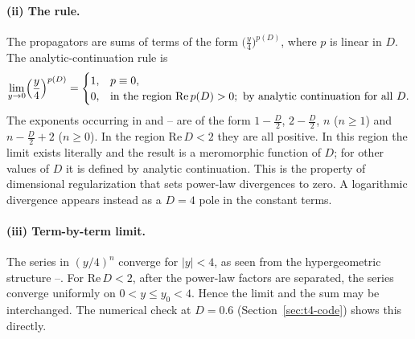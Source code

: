 \paragraph{(ii) The rule.} The propagators are sums of terms of the form
\(\bigl(\tfrac y4\bigr)^{p(D)}\), where \(p\) is linear in \(D\). The analytic-continuation
rule is
\begin{equation}\label{eq:t4-rule}
\lim_{y\to0}\Bigl(\frac y4\Bigr)^{p(D)}=\begin{cases}1,& p\equiv0,\\
0,& \text{in the region }\mathrm{Re}\,p(D)>0;\ \text{by analytic continuation for all }D.\end{cases}
\end{equation}
The exponents occurring in  and -- are of the form
\(1-\tfrac D2\), \(2-\tfrac D2\), \(n\) (\(n\ge1\)) and \(n-\tfrac D2+2\) (\(n\ge0\)). In the region
\(\mathrm{Re}\,D<2\) they are all positive. In this region the limit exists literally and
the result is a meromorphic function of \(D\); for other values of \(D\) it is defined by
analytic continuation. This is the property of dimensional regularization that sets
power-law divergences to zero. A logarithmic divergence appears instead as a \(D=4\) pole
in the constant terms.

\paragraph{(iii) Term-by-term limit.} The series in \((y/4)^n\) converge for \(|y|<4\), as
seen from the hypergeometric structure --. For \(\mathrm{Re}\,D<2\), after
the power-law factors are separated, the series converge uniformly on \(0<y\le y_0<4\).
Hence the limit and the sum may be interchanged. The numerical check at \(D=0.6\)
(Section~\ref{sec:t4-code}) shows this directly.

